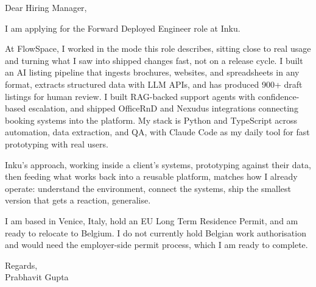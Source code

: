 \documentclass[a4paper,11pt]{article}
\begin{document}
Dear Hiring Manager,

I am applying for the Forward Deployed Engineer role at Inku.

At FlowSpace, I worked in the mode this role describes, sitting close to real usage and turning what I saw into shipped changes fast, not on a release cycle. I built an AI listing pipeline that ingests brochures, websites, and spreadsheets in any format, extracts structured data with LLM APIs, and has produced 900+ draft listings for human review. I built RAG-backed support agents with confidence-based escalation, and shipped OfficeRnD and Nexudus integrations connecting booking systems into the platform. My stack is Python and TypeScript across automation, data extraction, and QA, with Claude Code as my daily tool for fast prototyping with real users.

Inku's approach, working inside a client's systems, prototyping against their data, then feeding what works back into a reusable platform, matches how I already operate: understand the environment, connect the systems, ship the smallest version that gets a reaction, generalise.

I am based in Venice, Italy, hold an EU Long Term Residence Permit, and am ready to relocate to Belgium. I do not currently hold Belgian work authorisation and would need the employer-side permit process, which I am ready to complete.

Regards,\\
Prabhavit Gupta
\end{document}
